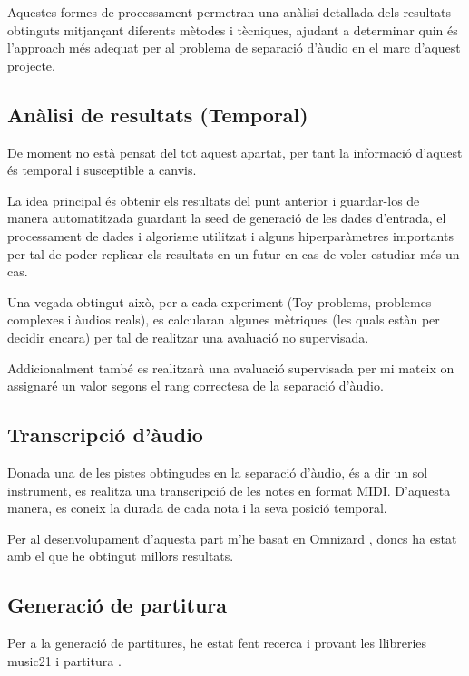 \documentclass[10pt,a4paper,twocolumn,twoside]{article}
\begin{document}
Aquestes formes de processament permetran una anàlisi detallada dels resultats obtinguts mitjançant diferents mètodes i tècniques, ajudant a determinar quin és l'approach més adequat per al problema de separació d'àudio en el marc d'aquest projecte.

\subsection{Anàlisi de resultats (Temporal)}

De moment no està pensat del tot aquest apartat, per tant la informació d'aquest és temporal i susceptible a canvis.

La idea principal és obtenir els resultats del punt anterior i guardar-los de manera automatitzada guardant la seed de generació de les dades d'entrada, el processament de dades i algorisme utilitzat i alguns hiperparàmetres importants per tal de poder replicar els resultats en un futur en cas de voler estudiar més un cas.

Una vegada obtingut això, per a cada experiment (Toy problems, problemes complexes i àudios reals), es calcularan algunes mètriques (les quals estàn per decidir encara) per tal de realitzar una avaluació no supervisada.

Addicionalment també es realitzarà una avaluació supervisada per mi mateix on assignaré un valor segons el rang correctesa de la separació d'àudio.

\subsection{Transcripció d'àudio}

Donada una de les pistes obtingudes en la separació d'àudio, és a dir un sol instrument, es realitza una transcripció de les notes en format MIDI. D'aquesta manera, es coneix la durada de cada nota i la seva posició temporal. \cite{music-transcription-app132111882} 

Per al desenvolupament d'aquesta part m'he basat en Omnizard \cite{Omnizard-Wu2021}, doncs ha estat amb el que he obtingut millors resultats.


\subsection{Generació de partitura}

Per a la generació de partitures, he estat fent recerca i provant les llibreries music21 \cite{music21-conf/ismir/CuthbertA10} i partitura \cite{partitura_mec}.
\end{document}
